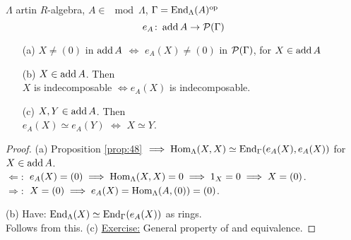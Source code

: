 \begin{lem}
$\Lambda$ artin $R$-algebra, $A \in \mod \Lambda$, $\Gamma = \operatorname{End}_\Lambda(A)^{{\operatorname{op}\nolimits}}$
\[ e_A\colon \operatorname{add} A \to \mathcal{P}(\Gamma) \]
\begin{enumerate}
\item[(a)] $X \neq (0)$ in $\operatorname{add} A$ $\iff$ $e_A(X) \neq (0)$ in $\mathcal{P}(\Gamma)$, for $X \in \operatorname{add} A$

\item[(b)] $X \in \operatorname{add} A$.  Then \\
$X$ is indecomposable $\iff e_A(X)$ is indecomposable. 
\item[(c)] $X, Y \in \operatorname{add} A$. Then\\
$e_A(X) \simeq e_A(Y)$ $\iff$ $X \simeq Y$. 
\end{enumerate}
\end{lem}
\begin{proof}
(a) Proposition \ref{prop:48} $\implies \operatorname{Hom}_\Lambda(X, X) \simeq \operatorname{End}_\Gamma(e_A(X), e_A(X))$ for $X \in \operatorname{add} A$.\\
\underline{$\Leftarrow:$} $e_A(X) = (0) \implies \operatorname{Hom}_\Lambda(X,X) = 0 \implies 1_X = 0 \implies X = (0)$.\\
\underline{$\Rightarrow:$} $X = (0) \implies e_A(X) = \operatorname{Hom}_\Lambda(A, (0)) = (0)$.

(b) Have: $\operatorname{End}_\Lambda(X) \simeq \operatorname{End}_\Gamma(e_A(X))$ as rings.\\
Follows from this.
(c) \underline{Exercise:} General property of and equivalence.
\end{proof}


